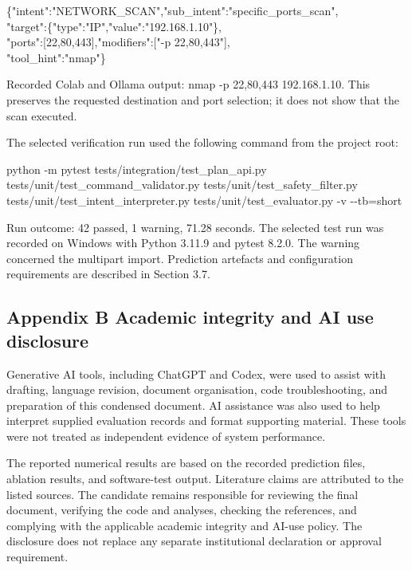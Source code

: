 \documentclass[
]{article}
\begin{document}
\{"intent":"NETWORK\_SCAN","sub\_intent":"specific\_ports\_scan",\\
"target":\{"type":"IP","value":"192.168.1.10"\},\\
"ports":{[}22,80,443{]},"modifiers":{[}"-p 22,80,443"{]},\\
"tool\_hint":"nmap"\}

Recorded Colab and Ollama output: nmap -p 22,80,443 192.168.1.10. This
preserves the requested destination and port selection; it does not show
that the scan executed.

The selected verification run used the following command from the
project root:

python -m pytest tests/integration/test\_plan\_api.py
tests/unit/test\_command\_validator.py
tests/unit/test\_safety\_filter.py
tests/unit/test\_intent\_interpreter.py tests/unit/test\_evaluator.py -v
-\/-tb=short

Run outcome: 42 passed, 1 warning, 71.28 seconds. The selected test run
was recorded on Windows with Python 3.11.9 and pytest 8.2.0. The warning
concerned the multipart import. Prediction artefacts and configuration
requirements are described in Section 3.7.

\hypertarget{appendix-b-academic-integrity-and-ai-use-disclosure}{%
\subsection{Appendix B Academic integrity and AI use
disclosure}\label{appendix-b-academic-integrity-and-ai-use-disclosure}}

Generative AI tools, including ChatGPT and Codex, were used to assist
with drafting, language revision, document organisation, code
troubleshooting, and preparation of this condensed document. AI
assistance was also used to help interpret supplied evaluation records
and format supporting material. These tools were not treated as
independent evidence of system performance.

The reported numerical results are based on the recorded prediction
files, ablation results, and software-test output. Literature claims are
attributed to the listed sources. The candidate remains responsible for
reviewing the final document, verifying the code and analyses, checking
the references, and complying with the applicable academic integrity and
AI-use policy. The disclosure does not replace any separate
institutional declaration or approval requirement.
\end{document}

